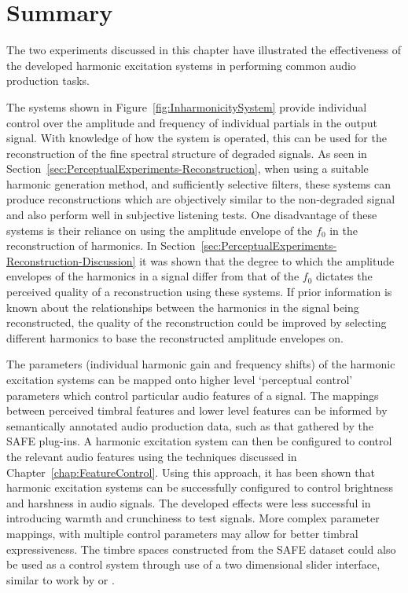 \section{Summary}
\label{sec:PerceptualExperiments-Summary}
	The two experiments discussed in this chapter have illustrated the effectiveness of the developed harmonic
	excitation systems in performing common audio production tasks. 
	
	The systems shown in Figure~\ref{fig:InharmonicitySystem} provide individual control over the amplitude and
	frequency of individual partials in the output signal. With knowledge of how the system is operated, this can be
	used for the reconstruction of the fine spectral structure of degraded signals. As seen in
	Section~\ref{sec:PerceptualExperiments-Reconstruction}, when using a suitable harmonic generation method, and
	sufficiently selective filters, these systems can produce reconstructions which are objectively similar to the
	non-degraded signal and also perform well in subjective listening tests. One disadvantage of these systems is their
	reliance on using the amplitude envelope of the $f_{0}$ in the reconstruction of harmonics. In
	Section~\ref{sec:PerceptualExperiments-Reconstruction-Discussion} it was shown that the degree to which the
	amplitude envelopes of the harmonics in a signal differ from that of the $f_{0}$ dictates the perceived quality of
	a reconstruction using these systems. If prior information is known about the relationships between the harmonics
	in the signal being reconstructed, the quality of the reconstruction could be improved by selecting different
	harmonics to base the reconstructed amplitude envelopes on.

	The parameters (individual harmonic gain and frequency shifts) of the harmonic excitation systems can be mapped
	onto higher level `perceptual control' parameters which control particular audio features of a signal. The mappings
	between perceived timbral features and lower level features can be informed by semantically annotated audio
	production data, such as that gathered by the SAFE plug-ins. A harmonic excitation system can then be configured to
	control the relevant audio features using the techniques discussed in Chapter~\ref{chap:FeatureControl}. Using this
	approach, it has been shown that harmonic excitation systems can be successfully configured to control brightness
	and harshness in audio signals. The developed effects were less successful in introducing warmth and crunchiness to
	test signals. More complex parameter mappings, with multiple control parameters may allow for better timbral
	expressiveness. The timbre spaces constructed from the SAFE dataset could also be used as a control system through
	use of a two dimensional slider interface, similar to work by \citet{schwarz2007corpus} or \citet{stasis2015a}.

